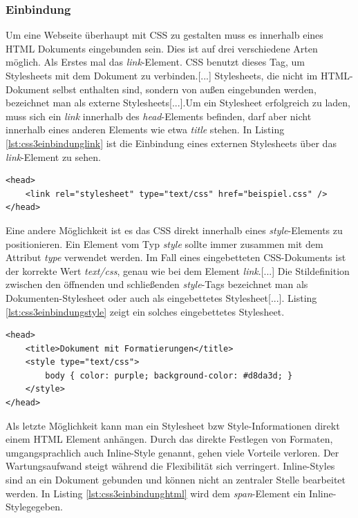 \subsubsection{Einbindung} Um eine Webseite überhaupt mit CSS zu gestalten muss es innerhalb eines HTML Dokuments eingebunden sein. Dies ist auf drei verschiedene Arten möglich. Als Erstes mal das \textit{link}-Element. \glqq CSS benutzt dieses Tag, um Stylesheets mit dem Dokument zu verbinden.[...] Stylesheets, die nicht im HTML-Dokument selbst enthalten sind, sondern von außen eingebunden werden, bezeichnet man als externe Stylesheets[...].Um ein Stylesheet erfolgreich zu laden, muss sich ein \textit{link} innerhalb des \textit{head}-Elements befinden, darf aber nicht innerhalb eines anderen Elements wie etwa \textit{title} stehen.\grqq{}\cite[S.14]{MeyeCasc2005} In Listing \ref{lst:css3einbindunglink} ist die Einbindung eines externen Stylesheets über das \textit{link}-Element zu sehen.
	
	\vspace{1em}
	\lstset{language=html}
	\begin{lstlisting}[frame=htrbl, caption=Stylesheet Einbindung über \textit{link}-Element, label=lst:css3einbindunglink]
<head>
    <link rel="stylesheet" type="text/css" href="beispiel.css" />
</head>
	\end{lstlisting}

Eine andere Möglichkeit ist es das CSS direkt innerhalb eines \textit{style}-Elements zu positionieren. Ein Element vom Typ \glqq \textit{style} sollte immer zusammen mit dem Attribut \textit{type} verwendet werden. Im Fall eines eingebetteten CSS-Dokuments ist der korrekte Wert \glqq \textit{text/css}\grqq, genau wie bei dem Element \textit{link}.[...] Die Stildefinition zwischen den öffnenden und schließenden \textit{style}-Tags bezeichnet man als Dokumenten-Stylesheet oder auch als eingebettetes Stylesheet[...].\grqq{}\cite[S.19]{MeyeCasc2005} Listing \ref{lst:css3einbindungstyle} zeigt ein solches eingebettetes Stylesheet.

	\vspace{1em}
	\lstset{language=html}
	\begin{lstlisting}[frame=htrbl, caption=Stylesheet Einbindung über \textit{style}-Element, label=lst:css3einbindungstyle]
<head>
	<title>Dokument mit Formatierungen</title>
	<style type="text/css">
		body { color: purple; background-color: #d8da3d; }
	</style>
</head>
	\end{lstlisting}
	
Als letzte Möglichkeit kann man ein Stylesheet bzw Style-Informationen direkt einem HTML Element anhängen. \glqq Durch das direkte Festlegen von Formaten, umgangsprachlich auch \glqq Inline-Style\grqq{} genannt, gehen viele Vorteile verloren. Der Wartungsaufwand steigt während die Flexibilität sich verringert. Inline-Styles sind an ein Dokument gebunden und können nicht an zentraler Stelle bearbeitet werden.\grqq{}\cite{SelfHtml20144} In Listing \ref{lst:css3einbindunghtml} wird dem \textit{span}-Element ein \glqq Inline-Style\grqq gegeben.

